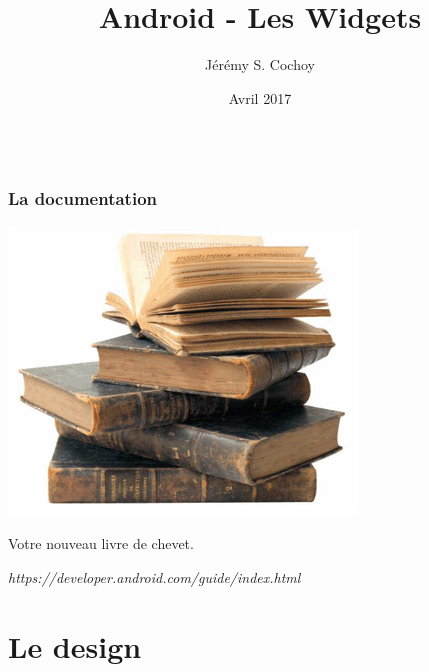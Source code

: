 \documentclass{beamer}
\begin{document}
\title{Android - Les Widgets}
\author{Jérémy S. Cochoy}
\date{Avril 2017}


\begin{frame}
\titlepage
\end{frame}

\begin{frame}
  \begin{columns}[t]
  \begin{column}{5cm}
  \tableofcontents[sections={1-2}]
  \end{column}
  \begin{column}{5cm}
  \tableofcontents[sections={3-8}]
  \end{column}
  \end{columns}
\end{frame}

\begin{frame}
\frametitle{La documentation}
\begin{center}
\includegraphics[scale=0.5]{livres.png}
\end{center}
\begin{block}{Votre nouveau livre de chevet.}
\begin{center}
\emph{https://developer.android.com/guide/index.html}
\end{center}
\end{block}

\end{frame}

\section{Le design}
\end{document}
